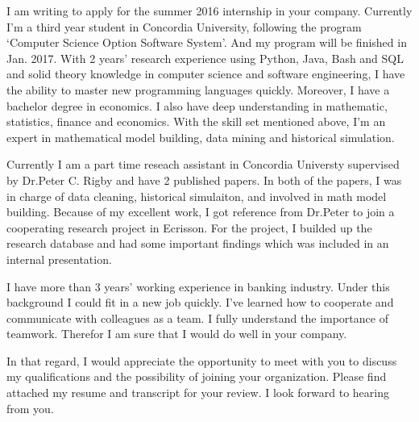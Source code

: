 \documentclass[11pt, a4paper]{awesome-cv} %
\begin{document}
\makecvheader %

\makelettertitle %


\begin{cvletter}



I am writing to apply for the summer 2016 internship in your company. 
Currently I'm a third year student in Concordia University, following the program ‘Computer Science Option Software System’. 
And my program will be finished in Jan. 2017. 
With 2 years' research experience using Python, Java, Bash and SQL and solid theory knowledge in computer science and software engineering, 
I have the ability to master new programming languages quickly.
Moreover, I have a bachelor degree in economics.
I also have deep understanding in mathematic, statistics, finance and economics.
With the skill set mentioned above, I’m an expert in mathematical model building, data mining and historical simulation. 

Currently I am a part time reseach assistant in Concordia Universty supervised by Dr.Peter C. Rigby and have 2 published papers. 
In both of the papers, I was in charge of data cleaning, historical simulaiton, and involved in math model building. 
Because of my excellent work, I got reference from Dr.Peter to join a cooperating research project in Ecrisson. 
For the project, I builded up the research database and had some important findings which was included in an internal presentation.

I have more than 3 years’ working experience in banking industry. 
Under this background I could fit in a new job quickly. 
I’ve learned how to cooperate and communicate with colleagues as a team. 
I fully understand the importance of teamwork. 
Therefor I am sure that I would do well in your company.   



In that regard, I would appreciate the opportunity to meet with you to discuss my qualifications and the possibility of joining your organization. Please find attached my resume and transcript for your review. I look forward to hearing from you.

\end{cvletter}


\makeletterclosing %
\end{document}
